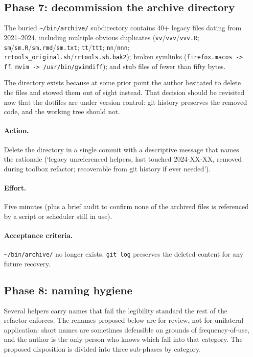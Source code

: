 \documentclass[11pt,letterpaper]{scrartcl}
\begin{document}
\subsection{Phase 7: decommission the archive directory}

The buried \texttt{\textasciitilde/bin/archive/} subdirectory
contains 40+ legacy files dating from 2021--2024, including
multiple obvious duplicates (\texttt{vv}/\texttt{vvv}/\texttt{vvv.R};
\texttt{sm}/\texttt{sm.R}/\texttt{sm.rmd}/\texttt{sm.txt};
\texttt{tt}/\texttt{ttt}; \texttt{nn}/\texttt{nnn};
\texttt{rrtools\_original.sh}/\texttt{rrtools.sh.bak2}); broken
symlinks (\texttt{firefox.macos -> ff},
\texttt{mvim -> /usr/bin/gvimdiff}); and stub files of fewer than
fifty bytes.

The directory exists because at some prior point the author
hesitated to delete the files and stowed them out of sight
instead. That decision should be revisited now that the dotfiles
are under version control: git history preserves the removed
code, and the working tree should not.

\paragraph{Action.} Delete the directory in a single commit with
a descriptive message that names the rationale (`legacy
unreferenced helpers, last touched 2024-XX-XX, removed during
toolbox refactor; recoverable from git history if ever needed').

\paragraph{Effort.} Five minutes (plus a brief audit to confirm
none of the archived files is referenced by a script or
scheduler still in use).

\paragraph{Acceptance criteria.} \texttt{\textasciitilde/bin/archive/}
no longer exists. \texttt{git log} preserves the deleted
content for any future recovery.

\subsection{Phase 8: naming hygiene}

Several helpers carry names that fail the legibility standard the
rest of the refactor enforces. The renames proposed below are for
review, not for unilateral application: short names are sometimes
defensible on grounds of frequency-of-use, and the author is the
only person who knows which fall into that category. The proposed
disposition is divided into three sub-phases by category.
\end{document}
